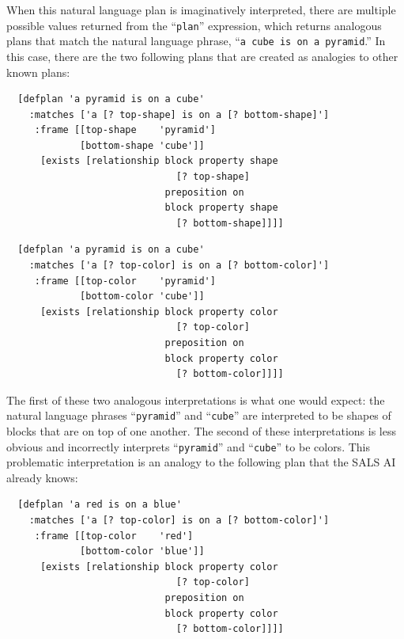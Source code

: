When this natural language plan is imaginatively interpreted, there
are multiple possible values returned from the ``{\tt{plan}}''
expression, which returns analogous plans that match the natural
language phrase, ``{\tt{a cube is on a pyramid}}.''  In this case,
there are the two following plans that are created as analogies to
other known plans:
\begin{packed_enumerate}
\item{
\begin{samepage}
\begin{Verbatim}
  [defplan 'a pyramid is on a cube'
    :matches ['a [? top-shape] is on a [? bottom-shape]']
     :frame [[top-shape    'pyramid']
             [bottom-shape 'cube']]
      [exists [relationship block property shape
                              [? top-shape]
                            preposition on
                            block property shape
                              [? bottom-shape]]]]
\end{Verbatim}
\end{samepage}
}
\item{
\begin{samepage}
\begin{Verbatim}
  [defplan 'a pyramid is on a cube'
    :matches ['a [? top-color] is on a [? bottom-color]']
     :frame [[top-color    'pyramid']
             [bottom-color 'cube']]
      [exists [relationship block property color
                              [? top-color]
                            preposition on
                            block property color
                              [? bottom-color]]]]
\end{Verbatim}
\end{samepage}
}
\end{packed_enumerate}
The first of these two analogous interpretations is what one would
expect: the natural language phrases ``{\tt{pyramid}}'' and
``{\tt{cube}}'' are interpreted to be shapes of blocks that are on top
of one another.  The second of these interpretations is less obvious
and incorrectly interprets ``{\tt{pyramid}}'' and ``{\tt{cube}}'' to
be colors.  This problematic interpretation is an analogy to the
following plan that the SALS AI already knows:
\begin{samepage}
\begin{Verbatim}
  [defplan 'a red is on a blue'
    :matches ['a [? top-color] is on a [? bottom-color]']
     :frame [[top-color    'red']
             [bottom-color 'blue']]
      [exists [relationship block property color
                              [? top-color]
                            preposition on
                            block property color
                              [? bottom-color]]]]
\end{Verbatim}
\end{samepage}
